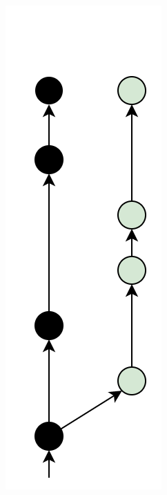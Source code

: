 \documentclass[aspectratio=169]{beamer} %
\begin{document}
\begin{frame}
\begin{columns}[c]
		\begin{minipage}[t][6.5cm][t]{\textwidth}
			\begin{figure}
				\centering
				\includegraphics[width=.55\textwidth]{./img/pr-branch.png}
			\end{figure}
		\end{minipage}
		
		
	\end{columns}
\end{frame}
\end{document}
